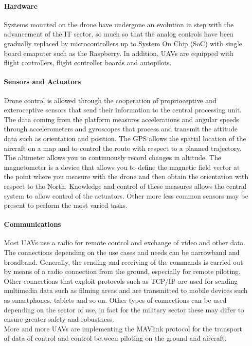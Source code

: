 \paragraph{Hardware}
Systems mounted on the drone have undergone an evolution in step
with the advancement of the IT sector, so much so that the analog controls have
been gradually replaced by microcontrollers up to System On Chip (SoC) with
single board cmaputer such as the Raspberry. In addition, UAVs are equipped with
flight controllers, flight controller boards and autopilots.
%
\paragraph{Sensors and Actuators}
Drone control is allowed through the cooperation of proprioceptive and
exteroceptive sensors that send their information to the central processing
unit.
The data coming from the platform measures accelerations and angular speeds
through accelerometers and gyroscopes that process and transmit the attitude
data such as orientation and position.
The GPS allows the spatial location of the aircraft on a map and to control the
route with respect to a planned trajectory. The altimeter allows you to
continuously record changes in altitude. The magnetometer is a device that
allows you to define the magnetic field vector at the point where you measure
with the drone and then obtain the orientation with respect to the North.
Knowledge and control of these measures allows the central system to allow
control of the actuators. Other more less common sensors may be present to
perform the most varied tasks.
%
\paragraph{Communications}
Most UAVs use a radio for remote control and exchange of video and other data.
The connections depending on the use cases and needs can be narrowband and
broadband. Generally, the sending and receiving of the commands is carried out
by means of a radio connection from the ground, especially for remote piloting.\\
Other connections that exploit protocols such as TCP/IP are used for sending
multimedia data such as filming areas and are transmitted to mobile devices such
as smartphones, tablets and so on.
Other types of connections can be used depending on the sector of use, in fact
for the military sector these may differ to ensure greater safety and
robustness.\\ 
More and more UAVs are implementing the MAVlink protocol for the
transport of data of control and control between piloting on the ground and
aircraft.
%
%
